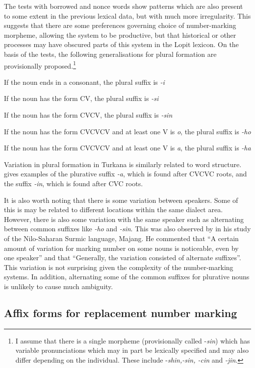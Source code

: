 \documentclass[output=paper]{langsci/langscibook}
\begin{document}
The tests with borrowed and nonce words show patterns which are also present to some extent in the previous lexical data, but with much more irregularity. This suggests that there are some preferences governing choice of number-marking morpheme, allowing the system to be productive, but that historical or other processes may have obscured parts of this system in the Lopit lexicon. On the basis of the tests, the following generalisations for plural formation are provisionally proposed.\footnote{I assume that there is a single morpheme (provisionally called -\textit{sin}) which has variable pronunciations which may in part be lexically specified and may also differ depending on the individual. These include -\textit{shin,-sin, -cin }and \textit{{}-jin}.}

\ea\label{ex:moodie:3} If the noun ends in a consonant, the plural suffix is \textit{-i}

If the noun has the form CV, the plural suffix is \textit{-si} 

If the noun has the form CVCV, the plural suffix is \textit{-sin} 

If the noun has the form CVCVCV and at least one V is\textit{ o}, the plural suffix is \textit{-ho} 

If the noun has the form CVCVCV and at least one V is \textit{a}, the plural suffix is \textit{-ha} 
\z

Variation in plural formation in Turkana is similarly related to word structure. \citet[235]{Dimmendaal2000} gives examples of the plurative suffix \textit{{}-a}, which is found after CVCVC roots, and the suffix \textit{{}-in}, which is found after CVC roots. 

It is also worth noting that there is some variation between speakers. Some of this is may be related to different locations within the same dialect area. However, there is also some variation with the same speaker such as alternating between common suffixes like \textit{-ho} and \textit{-sin}. This was also observed by \citet[76]{Unseth1988} in his study of the Nilo-Saharan Surmic language, Majang. He commented that “A certain amount of variation for marking number on some nouns is noticeable, even by one speaker” and that “Generally, the variation consisted of alternate suffixes”. This variation is not surprising given the complexity of the number-marking systems. In addition, alternating some of the common suffixes for plurative nouns is unlikely to cause much ambiguity.

\subsection{Affix forms for replacement number marking} \label{sec:moodie:4.3}
\end{document}
